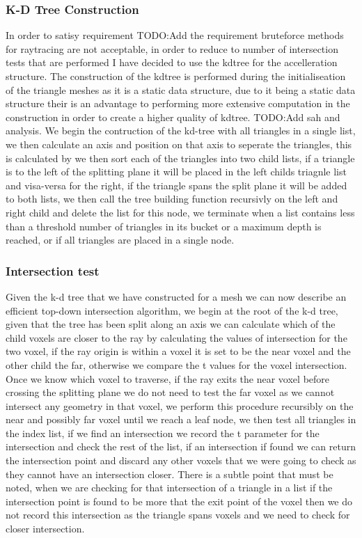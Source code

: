 \subsubsection{K-D Tree Construction}
In order to satisy requirement TODO:Add the requirement bruteforce methods for raytracing are not acceptable, in order to reduce
to number of intersection tests that are performed I have decided to use the kdtree for the accelleration structure. The
construction of the kdtree is performed during the initialiseation of the triangle meshes as it is a static data structure, due
to it being a static data structure their is an advantage to performing more extensive computation in the construction in
order to create a higher quality of kdtree. TODO:Add sah and analysis. We begin the contruction of the kd-tree with all
triangles in a single list, we then calculate an axis and position on that axis to seperate the triangles, this is calculated
by  we then sort each of the triangles into two child lists, if a triangle is
to the left of the splitting plane it will be placed in the left childs triagnle list and visa-versa for the right, if the
triangle spans the split plane it will be added to both lists, we then call the tree building function recursivly on the
left and right child and delete the list for this node, we terminate when a list contains less than a threshold number
of triangles in its bucket or a maximum depth is reached, or if all triangles are placed in a single node.

\subsubsection{Intersection test}
Given the k-d tree that we have constructed for a mesh we can now describe an efficient top-down intersection algorithm,
we begin at the root of the k-d tree, given that the tree has been split along an axis we can calculate which of the
child voxels are closer to the ray by calculating the values of intersection for the two voxel, if the ray origin is
within a voxel it is set to be the near voxel and the other child the far, otherwise we compare the t values for the
voxel intersection. Once we know which voxel to traverse, if the ray exits the near voxel before crossing the splitting
plane we do not need to test the far voxel as we cannot intersect any geometry in that voxel, we perform this procedure
recursibly on the near and possibly far voxel until we reach a leaf node, we then test all triangles in the index list,
if we find an intersection we record the t parameter for the intersection and check the rest of the list, if an intersection
if found we can return the intersection point and discard any other voxels that we were going to check as they cannot
have an intersection closer. There is a subtle point that must be noted, when we are checking for that intersection of
a triangle in a list if the intersection point is found to be more that the exit point of the voxel then we do not
record this intersection as the triangle spans voxels and we need to check for closer intersection.


